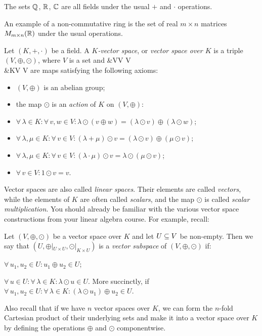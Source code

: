 \be
The sets $\mathbb{Q}$, $\mathbb{R}$, $\mathbb{C}$ are all fields under the usual $+$ and $\cdot$ operations.
\ee

\be
An example of a non-commutative ring is the set of real $m\times n$ matrices $M_{m\times n}(\mathbb{R})$ under the usual operations.
\ee

\bd
Let $(K,+,\cdot)$ be a field. A $K$\emph{-vector space}, or \emph{vector space over $K$} is a triple $(V,\oplus,\odot)$, where $V$ is a set and 
\oplus &\cl V\times V \to V\\
\odot  &\cl K\times V \to V
\ei
are maps satisfying the following axioms:
\begin{itemize}
\item $(V,\oplus)$ is an abelian group;
\item the map $\odot$ is an \emph{action} of $K$ on $(V,\oplus)$:
\ben[label=\roman*)]
\item $\forall \, \lambda \in K : \forall \, v,w \in V : \lambda\odot(v\oplus w)=(\lambda\odot v)\oplus (\lambda\odot w)$;
\item $\forall \, \lambda,\mu \in K : \forall \, v \in V : (\lambda+\mu)\odot v= (\lambda \odot v) \oplus (\mu \odot v)$;
\item $\forall \, \lambda,\mu \in K : \forall \, v \in V : (\lambda\cdot\mu)\odot v= \lambda \odot (\mu \odot v)$;
\item $\forall \, v \in V : 1\odot v = v$.
\een
\end{itemize}
\ed

Vector spaces are also called \emph{linear spaces}. Their elements are called \emph{vectors}, while the elements of $K$ are often called \emph{scalars}, and the map $\odot$ is called \emph{scalar multiplication}. You should already be familiar with the various vector space constructions from your linear algebra course. For example, recall:

\bd
Let $(V,\oplus,\odot)$ be a vector space over $K$ and let $U\subseteq V$ be non-empty. Then we say that $(U,\oplus|_{U\times U},\odot|_{K\times U})$ is a \emph{vector subspace} of $(V,\oplus,\odot)$ if:
\ben
\item[i)] $\forall \, u_1,u_2\in U : u_1\oplus u_2 \in U$;
\item[ii)] $\forall \, u\in U : \forall \, \lambda \in K: \lambda\odot u \in U$.
\een
More succinctly, if $\forall\,u_1,u_2\in U:\forall \, \lambda \in K: (\lambda\odot u_1)\oplus u_2\in U$. 
\ed

Also recall that if we have $n$ vector spaces over $K$, we can form the $n$-fold Cartesian product of their underlying sets and make it into a vector space over $K$ by defining the operations $\oplus$ and $\odot$ componentwise.


